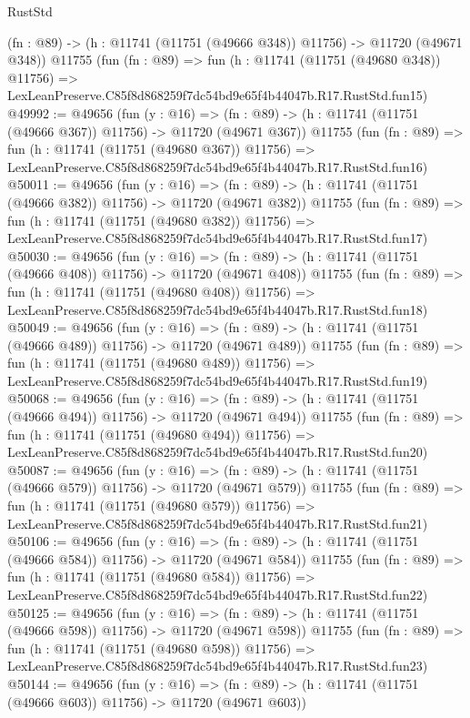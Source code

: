 \begin{lexlean}{RustStd}
\begin{coremodule}
    (fn : @89) -> (h : @11741 (@11751 (@49666 @348)) @11756) -> @11720 (@49671 @348))
    @11755
    (fun (fn : @89) =>
    fun (h : @11741 (@11751 (@49680 @348)) @11756) =>
    LexLeanPreserve.C85f8d868259f7dc54bd9e65f4b44047b.R17.RustStd.fun15)
@49992 := @49656
    (fun (y : @16) =>
    (fn : @89) -> (h : @11741 (@11751 (@49666 @367)) @11756) -> @11720 (@49671 @367))
    @11755
    (fun (fn : @89) =>
    fun (h : @11741 (@11751 (@49680 @367)) @11756) =>
    LexLeanPreserve.C85f8d868259f7dc54bd9e65f4b44047b.R17.RustStd.fun16)
@50011 := @49656
    (fun (y : @16) =>
    (fn : @89) -> (h : @11741 (@11751 (@49666 @382)) @11756) -> @11720 (@49671 @382))
    @11755
    (fun (fn : @89) =>
    fun (h : @11741 (@11751 (@49680 @382)) @11756) =>
    LexLeanPreserve.C85f8d868259f7dc54bd9e65f4b44047b.R17.RustStd.fun17)
@50030 := @49656
    (fun (y : @16) =>
    (fn : @89) -> (h : @11741 (@11751 (@49666 @408)) @11756) -> @11720 (@49671 @408))
    @11755
    (fun (fn : @89) =>
    fun (h : @11741 (@11751 (@49680 @408)) @11756) =>
    LexLeanPreserve.C85f8d868259f7dc54bd9e65f4b44047b.R17.RustStd.fun18)
@50049 := @49656
    (fun (y : @16) =>
    (fn : @89) -> (h : @11741 (@11751 (@49666 @489)) @11756) -> @11720 (@49671 @489))
    @11755
    (fun (fn : @89) =>
    fun (h : @11741 (@11751 (@49680 @489)) @11756) =>
    LexLeanPreserve.C85f8d868259f7dc54bd9e65f4b44047b.R17.RustStd.fun19)
@50068 := @49656
    (fun (y : @16) =>
    (fn : @89) -> (h : @11741 (@11751 (@49666 @494)) @11756) -> @11720 (@49671 @494))
    @11755
    (fun (fn : @89) =>
    fun (h : @11741 (@11751 (@49680 @494)) @11756) =>
    LexLeanPreserve.C85f8d868259f7dc54bd9e65f4b44047b.R17.RustStd.fun20)
@50087 := @49656
    (fun (y : @16) =>
    (fn : @89) -> (h : @11741 (@11751 (@49666 @579)) @11756) -> @11720 (@49671 @579))
    @11755
    (fun (fn : @89) =>
    fun (h : @11741 (@11751 (@49680 @579)) @11756) =>
    LexLeanPreserve.C85f8d868259f7dc54bd9e65f4b44047b.R17.RustStd.fun21)
@50106 := @49656
    (fun (y : @16) =>
    (fn : @89) -> (h : @11741 (@11751 (@49666 @584)) @11756) -> @11720 (@49671 @584))
    @11755
    (fun (fn : @89) =>
    fun (h : @11741 (@11751 (@49680 @584)) @11756) =>
    LexLeanPreserve.C85f8d868259f7dc54bd9e65f4b44047b.R17.RustStd.fun22)
@50125 := @49656
    (fun (y : @16) =>
    (fn : @89) -> (h : @11741 (@11751 (@49666 @598)) @11756) -> @11720 (@49671 @598))
    @11755
    (fun (fn : @89) =>
    fun (h : @11741 (@11751 (@49680 @598)) @11756) =>
    LexLeanPreserve.C85f8d868259f7dc54bd9e65f4b44047b.R17.RustStd.fun23)
@50144 := @49656
    (fun (y : @16) =>
    (fn : @89) -> (h : @11741 (@11751 (@49666 @603)) @11756) -> @11720 (@49671 @603))

\end{coremodule}
\end{lexlean}
